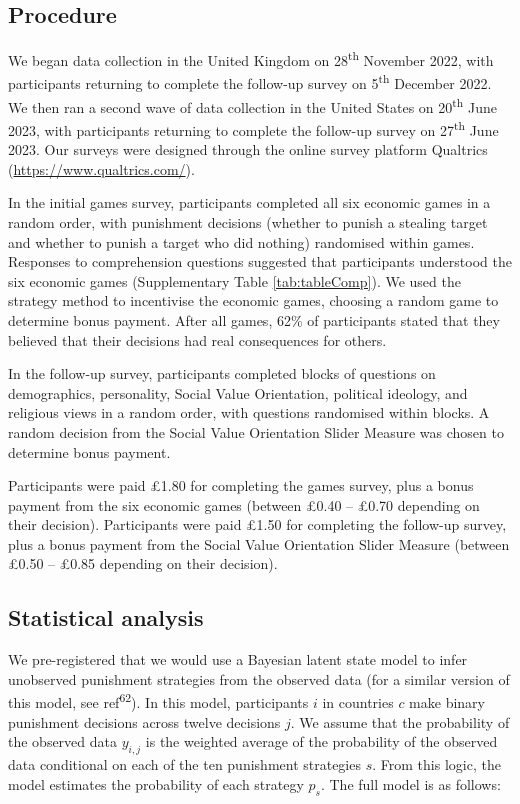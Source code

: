 \documentclass[
  man,floatsintext]{apa6}
\begin{document}
\hypertarget{procedure}{%
\subsection{Procedure}\label{procedure}}

We began data collection in the United Kingdom on 28\textsuperscript{th} November 2022, with
participants returning to complete the follow-up survey on 5\textsuperscript{th} December 2022.
We then ran a second wave of data collection in the United States on 20\textsuperscript{th} June
2023, with participants returning to complete the follow-up survey on 27\textsuperscript{th}
June 2023. Our surveys were designed through the online survey platform
Qualtrics (\url{https://www.qualtrics.com/}).

In the initial games survey, participants completed all six economic games in a
random order, with punishment decisions (whether to punish a stealing target and
whether to punish a target who did nothing) randomised within games. Responses
to comprehension questions suggested that participants understood the six
economic games (Supplementary Table \ref{tab:tableComp}). We used the strategy
method to incentivise the economic games, choosing a random game to determine
bonus payment. After all games,
62\%
of participants stated that they believed that their decisions had real
consequences for others.

In the follow-up survey, participants completed blocks of questions on
demographics, personality, Social Value Orientation, political ideology, and
religious views in a random order, with questions randomised within blocks. A
random decision from the Social Value Orientation Slider Measure was chosen to
determine bonus payment.

Participants were paid £1.80 for completing the games survey, plus a bonus
payment from the six economic games (between £0.40 -- £0.70 depending on their
decision). Participants were paid £1.50 for completing the follow-up survey,
plus a bonus payment from the Social Value Orientation Slider Measure (between
£0.50 -- £0.85 depending on their decision).

\hypertarget{statistical-analysis}{%
\subsection{Statistical analysis}\label{statistical-analysis}}

We pre-registered that we would use a Bayesian latent state model to infer
unobserved punishment strategies from the observed data (for a similar version
of this model, see ref\textsuperscript{62}). In this model, participants \(i\) in
countries \(c\) make binary punishment decisions across twelve decisions \(j\). We
assume that the probability of the observed data \(y_{i,j}\) is the weighted
average of the probability of the observed data conditional on each of the ten
punishment strategies \(s\). From this logic, the model estimates the probability
of each strategy \(p_{s}\). The full model is as follows:
\end{document}
